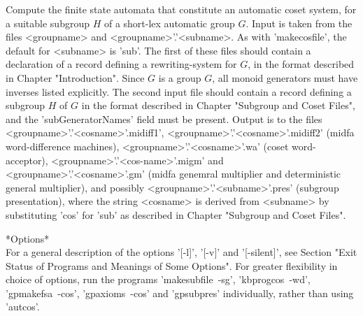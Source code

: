 Compute the finite state automata that constitute an automatic coset system,
for a suitable subgroup $H$ of a short-lex automatic group $G$.
Input is taken from the files <groupname> and <groupname>'.'<subname>.
As with 'makecosfile', the default for <subname> is 'sub'.
The first of these files should contain a declaration of a record defining a
rewriting-system for $G$, in the format described in Chapter "Introduction".
Since $G$ is a group $G$, all monoid generators must have
inverses listed explicitly. The second input file should contain a record
defining a subgroup $H$ of $G$ in the format described in Chapter
"Subgroup and Coset Files", and the 'subGeneratorNames' field must be present.
Output is to the files <groupname>'.'<cosname>'.midiff1',
<groupname>'.'<cosname>'.midiff2' (midfa word-difference machines),
<groupname>'.'<cosname>'.wa' (coset word-acceptor),
<groupname>'.'<cos-name>'.migm' and <groupname>'.'<cosname>'.gm'
(midfa genemral multiplier and deterministic general multiplier), and
possibly <groupname>'.'<subname>'.pres' (subgroup presentation), where
the string <cosname> is derived from <subname> by substituting
'cos' for 'sub' as described in Chapter "Subgroup and Coset Files".

*Options*\\
For a general description of the options '[-l]', '[-v]' and '[-silent]',
see Section
"Exit Status of Programs and Meanings of Some Options".
For greater flexibility in choice of options, run the programs
'makesubfile\ -sg', 'kbprogcos\ -wd', 'gpmakefsa\ -cos', 'gpaxioms\ -cos' and
'gpsubpres' individually, rather than using 'autcos'. 


